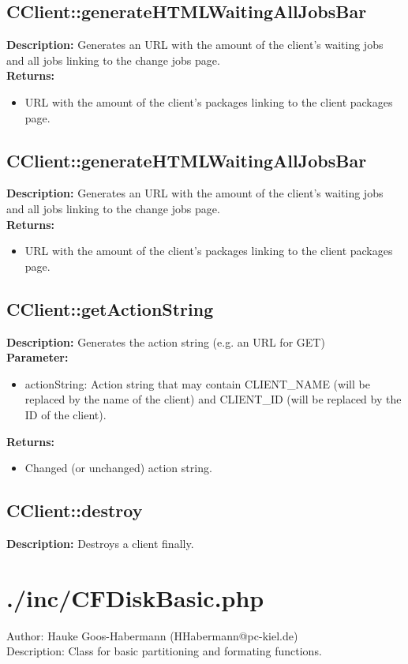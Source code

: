 \subsection{CClient::generateHTMLWaitingAllJobsBar}
\textbf{Description:} Generates an URL with the amount of the client's waiting jobs and all jobs linking to the change jobs page.\\
\textbf{Returns:}
\begin{itemize}
\item URL with the amount of the client's packages linking to the client packages page.
\end{itemize}

\subsection{CClient::generateHTMLWaitingAllJobsBar}
\textbf{Description:} Generates an URL with the amount of the client's waiting jobs and all jobs linking to the change jobs page.\\
\textbf{Returns:}
\begin{itemize}
\item URL with the amount of the client's packages linking to the client packages page.
\end{itemize}

\subsection{CClient::getActionString}
\textbf{Description:} Generates the action string (e.g. an URL for GET)\\
\textbf{Parameter:}
\begin{itemize}
\item actionString: Action string that may contain CLIENT\_NAME (will be replaced by the name of the client) and CLIENT\_ID (will be replaced by the ID of the client).
\end{itemize}
\textbf{Returns:}
\begin{itemize}
\item Changed (or unchanged) action string.
\end{itemize}

\subsection{CClient::destroy}
\textbf{Description:} Destroys a client finally.\\

\newpage\section{./inc/CFDiskBasic.php}
 Author: Hauke Goos-Habermann (HHabermann@pc-kiel.de)\\
 Description: Class for basic partitioning and formating functions.\\

